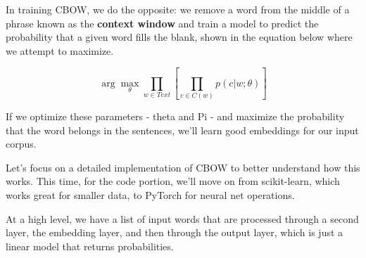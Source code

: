\documentclass[11pt, table]{diazessay} %
\begin{document}
\begin{sloppypar}
In training CBOW, we do the opposite: we remove a word from the middle of a phrase known as the \textbf{context window} and train  a model to predict the probability that a given word fills the blank, shown in the equation below where we attempt to maximize.

\begin{equation}
\arg\max_\theta \prod_{w\in Text}\left[\prod_{c \in C(w)} p(c|w;\theta)\right]
\end{equation}

If we optimize these parameters - theta and Pi - and maximize the probability that the word belongs in the sentences, we'll learn good embeddings for our input corpus.

Let's focus on a detailed implementation of CBOW to better understand how this works. This time, for the code portion, we'll move on from scikit-learn, which works great for smaller data, to PyTorch for neural net operations.  

At a high level, we have a list of input words that are processed through a second layer, the embedding layer, and then through the output layer, which is just a linear model that returns probabilities.

\def\layersep{2.5cm}
 \begin{figure}[H]
\end{figure}
\end{sloppypar}
\end{document}

